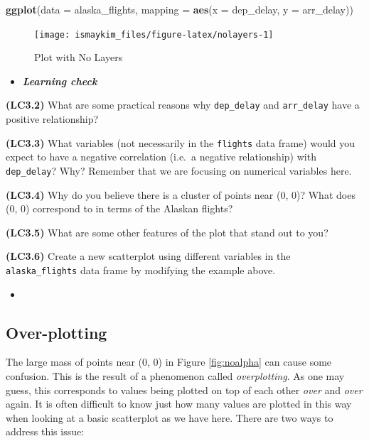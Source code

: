 \documentclass[12pt,]{krantz}
\makeatletter
\newenvironment{Shaded}{\begin{snugshade}}{\end{snugshade}}
\newcommand{\KeywordTok}[1]{\textcolor[rgb]{0.27,0.27,0.27}{\textbf{#1}}}
\newcommand{\DataTypeTok}[1]{\textcolor[rgb]{0.27,0.27,0.27}{#1}}
\newcommand{\NormalTok}[1]{#1}
\newenvironment{kframe}{%
\medskip{}
\setlength{\fboxsep}{.8em}
 \def\at@end@of@kframe{}%
 \ifinner\ifhmode%
  \def\at@end@of@kframe{\end{minipage}}%
  \begin{minipage}{\columnwidth}%
 \fi\fi%
 \def\FrameCommand##1{\hskip\@totalleftmargin \hskip-\fboxsep
 \colorbox{shadecolor}{##1}\hskip-\fboxsep
     \hskip-\linewidth \hskip-\@totalleftmargin \hskip\columnwidth}%
 \MakeFramed {\advance\hsize-\width
   \@totalleftmargin\z@ \linewidth\hsize
   \@setminipage}}%
 {\par\unskip\endMakeFramed%
 \at@end@of@kframe}
\renewenvironment{Shaded}{\begin{kframe}}{\end{kframe}}
\newenvironment{rmdblock}[1]
  {\begin{shaded*}
  \begin{itemize}
  \renewcommand{\labelitemi}{
    \raisebox{-.7\height}[0pt][0pt]{
    }
  }
  \item
  }
  {
  \end{itemize}
  \end{shaded*}
  }
\newenvironment{learncheck}
  {\begin{rmdblock}{warning}}
  {\end{rmdblock}}
\theoremstyle{definition}
\theoremstyle{definition}
\theoremstyle{definition}
\theoremstyle{remark}
\makeatother
\begin{document}
\begin{Shaded}
\begin{Highlighting}[]
\KeywordTok{ggplot}\NormalTok{(}\DataTypeTok{data =}\NormalTok{ alaska_flights, }
       \DataTypeTok{mapping =} \KeywordTok{aes}\NormalTok{(}\DataTypeTok{x =}\NormalTok{ dep_delay, }\DataTypeTok{y =}\NormalTok{ arr_delay))}
\end{Highlighting}
\end{Shaded}

\begin{figure}

{\centering \texttt{[image: ismaykim\_files/figure-latex/nolayers-1]} 

}

\caption{Plot with No Layers}\label{fig:nolayers}
\end{figure}

\begin{learncheck}
\textbf{\emph{Learning check}}
\end{learncheck}

\textbf{(LC3.2)} What are some practical reasons why \texttt{dep\_delay}
and \texttt{arr\_delay} have a positive relationship?

\textbf{(LC3.3)} What variables (not necessarily in the \texttt{flights}
data frame) would you expect to have a negative correlation (i.e.~a
negative relationship) with \texttt{dep\_delay}? Why? Remember that we
are focusing on numerical variables here.

\textbf{(LC3.4)} Why do you believe there is a cluster of points near
(0, 0)? What does (0, 0) correspond to in terms of the Alaskan flights?

\textbf{(LC3.5)} What are some other features of the plot that stand out
to you?

\textbf{(LC3.6)} Create a new scatterplot using different variables in
the \texttt{alaska\_flights} data frame by modifying the example above.

\begin{learncheck}

\end{learncheck}

\subsection{Over-plotting}\label{overplotting}

The large mass of points near (0, 0) in Figure \ref{fig:noalpha} can
cause some confusion. This is the result of a phenomenon called
\emph{overplotting}. As one may guess, this corresponds to values being
plotted on top of each other \emph{over} and \emph{over} again. It is
often difficult to know just how many values are plotted in this way
when looking at a basic scatterplot as we have here. There are two ways
to address this issue:
\end{document}
